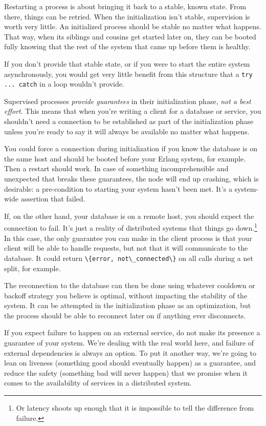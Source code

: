 \documentclass[11pt, oneside]{book}   	%
\newcommand{\expression}[1]{\Verb`#1`}
\begin{document}
Restarting a process is about bringing it back to a stable, known state. From there, things can be retried. When the initialization isn't stable, supervision is worth very little. An initialized process should be stable no matter what happens. That way, when its siblings and cousins get started later on, they can be booted fully knowing that the rest of the system that came up before them is healthy.

If you don't provide that stable state, or if you were to start the entire system asynchronously, you would get very little benefit from this structure that a \expression{try ... catch} in a loop wouldn't provide.

Supervised processes \emph{provide guarantees} in their initialization phase, \emph{not a best effort}. This means that when you're writing a client for a database or service, you shouldn't need a connection to be established as part of the initialization phase unless you're ready to say it will always be available no matter what happens.

You could force a connection during initialization if you know the database is on the same host and should be booted before your Erlang system, for example. Then a restart should work. In case of something incomprehensible and unexpected that breaks these guarantees, the node will end up crashing, which is desirable: a pre-condition to starting your system hasn't been met. It's a system-wide assertion that failed.

If, on the other hand, your database is on a remote host, you should expect the connection to fail. It's just a reality of distributed systems that things go down.\footnote{Or latency shoots up enough that it is impossible to tell the difference from failure.} In this case, the only guarantee you can make in the client process is that your client will be able to handle requests, but not that it will communicate to the database. It could return \expression{\{error, not\_connected\}} on all calls during a net split, for example.

The reconnection to the database can then be done using whatever cooldown or backoff strategy you believe is optimal, without impacting the stability of the system. It can be attempted in the initialization phase as an optimization, but the process should be able to reconnect later on if anything ever disconnects.

If you expect failure to happen on an external service, do not make its presence a guarantee of your system. We're dealing with the real world here, and failure of external dependencies is always an option. To put it another way, we're going to lean on liveness (something good should eventually happen) as a guarantee, and reduce the safety (something bad will never happen) that we promise when it comes to the availability of services in a distributed system.
\end{document}
